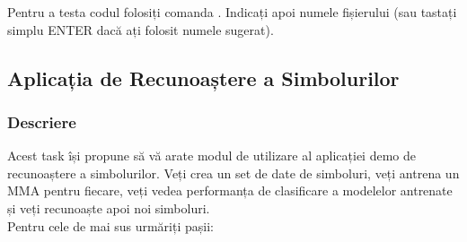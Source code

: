 \documentclass[12pt]{article}
\begin{document}
Pentru a testa codul folosiți comanda .
Indicați apoi numele fișierului (sau tastați simplu ENTER dacă ați
folosit numele sugerat).

\subsection{Aplicația de Recunoaștere a Simbolurilor}
\label{sec:symbol-recognition-app}

\subsubsection{Descriere}
Acest task își propune să vă arate modul de utilizare al aplicației demo de recunoaștere a simbolurilor.
Veți crea un set de date de simboluri, veți antrena un MMA pentru fiecare, veți vedea performanța de 
clasificare a modelelor antrenate și veți recunoaște apoi noi simboluri.\\%
Pentru cele de mai sus urmăriți pașii:\\%
\end{document}
